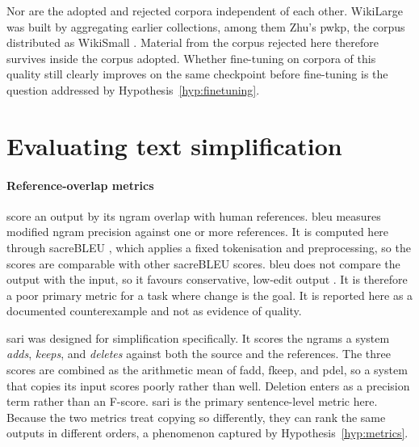 Nor are the adopted and rejected corpora independent of each other.
WikiLarge was built by aggregating earlier collections, among them Zhu's \gls{pwkp}, the corpus distributed as WikiSmall \parencite[588]{zhang-lapata-2017-sentence}.
Material from the corpus rejected here therefore survives inside the corpus adopted.
Whether fine-tuning on corpora of this quality still clearly improves on the same checkpoint before fine-tuning is the question addressed by Hypothesis~\cref{hyp:finetuning}.

\section{Evaluating text simplification}
\label{sec:background-evaluation}

\paragraph{Reference-overlap metrics} score an output by its \gls{ngram} overlap with human references.
\Gls{bleu} \parencite[312]{papineni-etal-2002-bleu} measures modified \gls{ngram} precision against one or more references.
It is computed here through sacreBLEU \parencite[186]{post-2018-call}, which applies a fixed tokenisation and preprocessing, so the scores are comparable with other sacreBLEU scores.
\Gls{bleu} does not compare the output with the input, so it favours conservative, low-edit output \parencite[410]{xu-etal-2016-optimizing}.
It is therefore a poor primary metric for a task where change is the goal.
It is reported here as a documented counterexample and not as evidence of quality.

\Gls{sari} \parencite[404--405]{xu-etal-2016-optimizing} was designed for simplification specifically.
It scores the \glspl{ngram} a system \emph{adds}, \emph{keeps}, and \emph{deletes} against both the source and the references.
The three scores are combined as the arithmetic mean of \gls{fadd}, \gls{fkeep}, and \gls{pdel}, so a system that copies its input scores poorly rather than well.
Deletion enters as a precision term rather than an F-score.
\Gls{sari} is the primary sentence-level metric here.
Because the two metrics treat copying so differently, they can rank the same outputs in different orders, a phenomenon captured by Hypothesis~\cref{hyp:metrics}.

